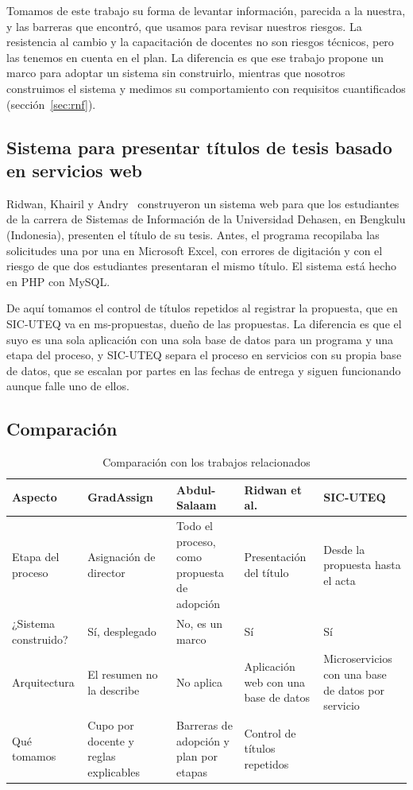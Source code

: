 Tomamos de este trabajo su forma de levantar información, parecida a la nuestra, y las barreras que encontró, que usamos para revisar nuestros riesgos. La resistencia al cambio y la capacitación de docentes no son riesgos técnicos, pero las tenemos en cuenta en el plan. La diferencia es que ese trabajo propone un marco para adoptar un sistema sin construirlo, mientras que nosotros construimos el sistema y medimos su comportamiento con requisitos cuantificados (sección~\ref{sec:rnf}).

\subsection{Sistema para presentar títulos de tesis basado en servicios web}

Ridwan, Khairil y Andry~\cite{ridwan2024thesis} construyeron un sistema web para que los estudiantes de la carrera de Sistemas de Información de la Universidad Dehasen, en Bengkulu (Indonesia), presenten el título de su tesis. Antes, el programa recopilaba las solicitudes una por una en Microsoft Excel, con errores de digitación y con el riesgo de que dos estudiantes presentaran el mismo título. El sistema está hecho en PHP con MySQL.

De aquí tomamos el control de títulos repetidos al registrar la propuesta, que en SIC-UTEQ va en ms-propuestas, dueño de las propuestas. La diferencia es que el suyo es una sola aplicación con una sola base de datos para un programa y una etapa del proceso, y SIC-UTEQ separa el proceso en servicios con su propia base de datos, que se escalan por partes en las fechas de entrega y siguen funcionando aunque falle uno de ellos.

\subsection{Comparación}

\begin{table}[ht]
\centering
\footnotesize
\caption{Comparación con los trabajos relacionados}\label{tab:comparacion}
\begin{tabularx}{\textwidth}{@{}L{2.6cm}YYYY@{}}
\toprule
Aspecto & GradAssign~\cite{grzelak2026gradassign} & Abdul-Salaam~\cite{abdulsalaam2024framework} & Ridwan et al.~\cite{ridwan2024thesis} & SIC-UTEQ \\
\midrule
Etapa del proceso & Asignación de director & Todo el proceso, como propuesta de adopción & Presentación del título & Desde la propuesta hasta el acta \\
¿Sistema construido? & Sí, desplegado & No, es un marco & Sí & Sí \\
Arquitectura & El resumen no la describe & No aplica & Aplicación web con una base de datos & Microservicios con una base de datos por servicio \\
Qué tomamos & Cupo por docente y reglas explicables & Barreras de adopción y plan por etapas & Control de títulos repetidos & \\
\bottomrule
\end{tabularx}
\end{table}
